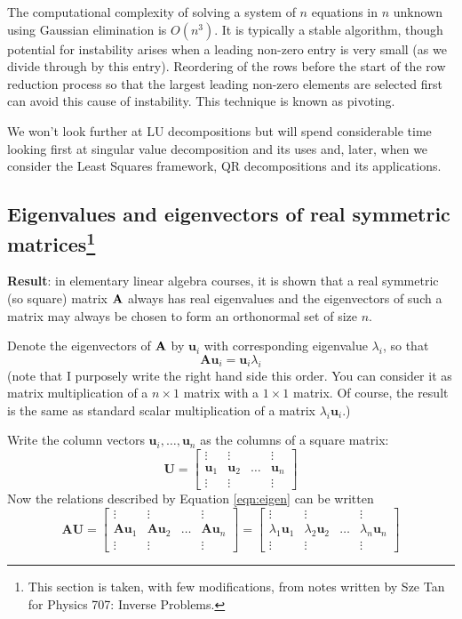 The computational complexity of solving a system of $n$ equations in $n$ unknown using Gaussian elimination is $O(n^3)$.  It is typically a stable algorithm, though potential for instability arises when a leading non-zero entry is very small (as we divide through by this entry).  Reordering of the rows before the start of the row reduction process so that the largest leading non-zero elements are selected first  can avoid this cause of instability.  This technique is known as pivoting.  

We won't look further at LU decompositions but will spend considerable time looking first at singular value decomposition and its uses and, later, when we consider the Least Squares framework, QR decompositions and its applications.

\subsection{Eigenvalues and eigenvectors of real symmetric matrices\footnote{This section is taken, with few modifications, from notes  written by Sze Tan for Physics 707: Inverse Problems.   }}
\label{sec:realsymmetric}

{\bf Result}: in elementary linear algebra courses, it is shown that a real symmetric (so square) matrix $\bf A$ always has real eigenvalues and the eigenvectors of such a matrix may always be chosen to form an orthonormal set of size $n$.

Denote the eigenvectors of $\bf A$ by $\mathbf u_i$ with corresponding eigenvalue $\lambda_i$, so that 
\begin{equation} \label{eqn:eigen}
\mathbf {Au}_i = \mathbf u_i \lambda_i
\end{equation}
  (note that I purposely write the right hand side this order. You can consider it as matrix multiplication of a $n\times1$ matrix with a $1\times 1$ matrix.  Of course, the result is the same as standard scalar multiplication of a matrix  $\lambda_i \mathbf u_i $.)


Write the column vectors $\mathbf u_i,\ldots, \mathbf u_n$ as the columns of a square matrix:
\[
\mathbf U =  \left[\begin{array}{cccc}
 \vdots & \vdots & & \vdots  \\
 \mathbf u_1 & \mathbf u_2 & \ldots & \mathbf u_n \\
\vdots & \vdots & & \vdots  
 \end{array}\right]
 \]
Now the relations described by Equation \ref{eqn:eigen} can be written
\[
\mathbf{AU} =  \left[\begin{array}{cccc}
 \vdots & \vdots & & \vdots  \\
 \mathbf {Au}_1 & \mathbf {Au}_2 & \ldots & \mathbf {Au}_n \\
\vdots & \vdots & & \vdots  
 \end{array}\right]
 =
\left[\begin{array}{cccc}
 \vdots & \vdots & & \vdots  \\
 \lambda_1 \mathbf u_1 & \lambda_2 \mathbf u_2 & \ldots &\lambda_n \mathbf u_n \\
\vdots & \vdots & & \vdots  
 \end{array}\right] 
 \]
 
